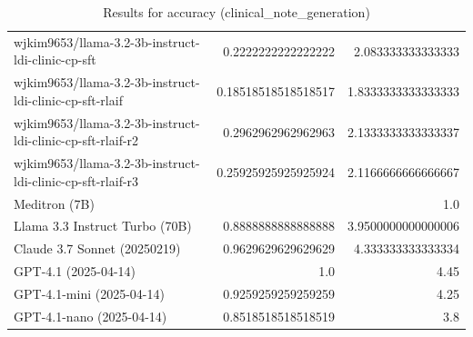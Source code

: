 \begin{table}[htp]
{\begin{tabular}{lrr}
wjkim9653/llama-3.2-3b-instruct-ldi-clinic-cp-sft & 0.2222222222222222 & 2.083333333333333 \\
wjkim9653/llama-3.2-3b-instruct-ldi-clinic-cp-sft-rlaif & 0.18518518518518517 & 1.8333333333333333 \\
wjkim9653/llama-3.2-3b-instruct-ldi-clinic-cp-sft-rlaif-r2 & 0.2962962962962963 & 2.1333333333333337 \\
wjkim9653/llama-3.2-3b-instruct-ldi-clinic-cp-sft-rlaif-r3 & 0.25925925925925924 & 2.1166666666666667 \\
Meditron (7B) &  & 1.0 \\
Llama 3.3 Instruct Turbo (70B) & 0.8888888888888888 & 3.9500000000000006 \\
Claude 3.7 Sonnet (20250219) & 0.9629629629629629 & 4.333333333333334 \\
GPT-4.1 (2025-04-14) & 1.0 & 4.45 \\
GPT-4.1-mini (2025-04-14) & 0.9259259259259259 & 4.25 \\
GPT-4.1-nano (2025-04-14) & 0.8518518518518519 & 3.8 \\
\bottomrule
\end{tabular}}
\caption{Results for accuracy (clinical_note_generation)}
\label{fig:accuracy (clinical_note_generation)}
\end{table}
